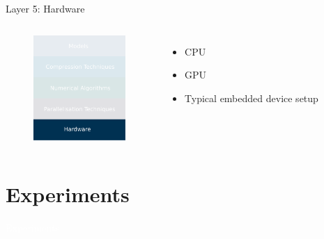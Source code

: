 \documentclass[xcolor=dvipsnames]{beamer}
\begin{document}
\begin{frame}{Layer 5: Hardware}

\begin{columns}


\begin{figure}
    \centering
    \includegraphics[width=3.5cm]{images/hardwares.pdf}
\end{figure}


\begin{itemize}
    \item CPU
    \item GPU
    \item Typical embedded device setup
\end{itemize}
\end{columns}


\end{frame}




\section{Experiments}

{
\begin{frame}
    \centering
    \textcolor{white}{\LARGE Experiments}
\end{frame}
}
\end{document}
